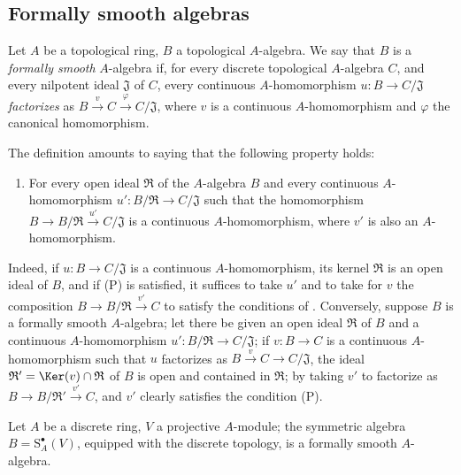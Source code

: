 \subsection{Formally smooth algebras}
\label{subsection:0.19.3}

\begin{definition}[19.3.1]
\label{0.19.3.1}
Let $A$ be a topological ring, $B$ a topological $A$-algebra.
We say that $B$ is a \emph{formally smooth} $A$-algebra if, for every discrete topological $A$-algebra $C$, and every nilpotent ideal $\mathfrak{J}$ of $C$, every continuous $A$-homomorphism $u:B\to C/\mathfrak{J}$ \emph{factorizes} as $B\xrightarrow{v}C\xrightarrow{\varphi}C/\mathfrak{J}$, where $v$ is a continuous $A$-homomorphism and $\varphi$ the canonical homomorphism.
\end{definition}

The definition  amounts to saying that the following property holds:
\begin{enumerate}
  \item[(P)] For every open ideal $\mathfrak{R}$ of the $A$-algebra $B$ and every continuous $A$-homomorphism $u':B/\mathfrak{R}\to C/\mathfrak{J}$ such that the homomorphism $B\to B/\mathfrak{R}\xrightarrow{u'}C/\mathfrak{J}$ is a continuous $A$-homomorphism, where $v'$ is also an $A$-homomorphism.
\end{enumerate}

Indeed, if $u:B\to C/\mathfrak{J}$ is a continuous $A$-homomorphism, its kernel $\mathfrak{R}$ is an open ideal of $B$, and if (P) is satisfied, it suffices to take $u'$ and to take for $v$ the composition $B\to B/\mathfrak{R}\xrightarrow{v'}C$ to satisfy the conditions of .
Conversely, suppose $B$ is a formally smooth $A$-algebra;
let there be given an open ideal $\mathfrak{R}$ of $B$ and a continuous $A$-homomorphism $u':B/\mathfrak{R}\to C/\mathfrak{J}$;
if $v:B\to C$ is a continuous $A$-homomorphism such that $u$ factorizes as $B\xrightarrow{v}C\to C/\mathfrak{J}$, the ideal $\mathfrak{R}'=\Ker(v)\cap\mathfrak{R}$ of $B$ is open and contained in $\mathfrak{R}$;
by taking $v'$ to factorize as $B\to B/\mathfrak{R}'\xrightarrow{v'}C$, and $v'$ clearly satisfies the condition (P).

\begin{proposition}[19.3.2]
\label{0.19.3.2}
Let $A$ be a discrete ring, $V$ a projective $A$-module;
the symmetric algebra $B=\mathrm{S}_A^\bullet(V)$, equipped with the discrete topology, is a formally smooth $A$-algebra.
\end{proposition}

